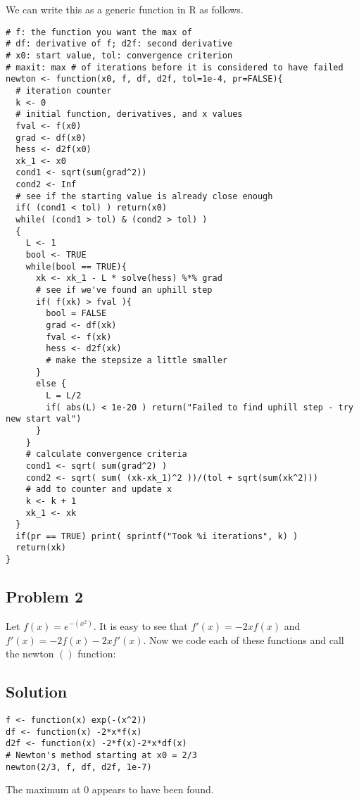 \documentclass[12pt]{article}
\begin{document}
We can write this as a generic function in R as follows.
\begin{verbatim}
# f: the function you want the max of
# df: derivative of f; d2f: second derivative
# x0: start value, tol: convergence criterion
# maxit: max # of iterations before it is considered to have failed
newton <- function(x0, f, df, d2f, tol=1e-4, pr=FALSE){
  # iteration counter
  k <- 0
  # initial function, derivatives, and x values
  fval <- f(x0)
  grad <- df(x0)
  hess <- d2f(x0)
  xk_1 <- x0
  cond1 <- sqrt(sum(grad^2))
  cond2 <- Inf
  # see if the starting value is already close enough
  if( (cond1 < tol) ) return(x0)
  while( (cond1 > tol) & (cond2 > tol) )
  {
    L <- 1
    bool <- TRUE
    while(bool == TRUE){
      xk <- xk_1 - L * solve(hess) %*% grad
      # see if we've found an uphill step
      if( f(xk) > fval ){
        bool = FALSE
        grad <- df(xk)
        fval <- f(xk)
        hess <- d2f(xk)
        # make the stepsize a little smaller
      } 
      else {
        L = L/2
        if( abs(L) < 1e-20 ) return("Failed to find uphill step - try new start val")
      }
    }
    # calculate convergence criteria
    cond1 <- sqrt( sum(grad^2) )
    cond2 <- sqrt( sum( (xk-xk_1)^2 ))/(tol + sqrt(sum(xk^2)))
    # add to counter and update x
    k <- k + 1
    xk_1 <- xk
  }
  if(pr == TRUE) print( sprintf("Took %i iterations", k) )
  return(xk)
}
\end{verbatim}

\subsection*{Problem 2}

Let $f(x)=e^{-(x^{2})}$. It is easy to see that $f'(x)=-2xf(x)$ and $f'(x)=-2f(x)-2xf'(x)$. 
Now we code each of these functions and call the newton $()$ function:
\subsection*{Solution}
\begin{verbatim}
f <- function(x) exp(-(x^2))
df <- function(x) -2*x*f(x)
d2f <- function(x) -2*f(x)-2*x*df(x)
# Newton's method starting at x0 = 2/3
newton(2/3, f, df, d2f, 1e-7)
\end{verbatim}


The maximum at $0$ appears to have been found.
\end{document}
